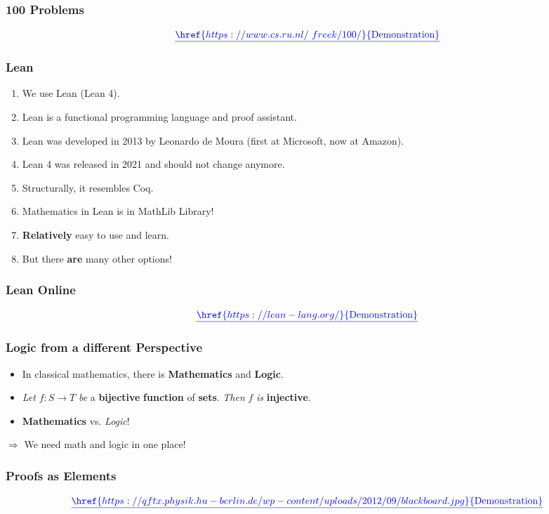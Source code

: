 \documentclass{beamer}
\theoremstyle{definition}
\theoremstyle{remark}
\begin{document}
\begin{frame}
	\frametitle{100 Problems}
	\[
		{\color{blue}\underline{\href{https://www.cs.ru.nl/~freek/100/}{\text{Demonstration}}}}
	\]
\end{frame}

\begin{frame}
	\frametitle{Lean}
		\begin{enumerate}
			\item We use Lean (Lean 4).
			\item Lean is a functional programming language and proof assistant.
			\item Lean was developed in 2013 by Leonardo de Moura (first at Microsoft, now at Amazon).
			\item Lean 4 was released in 2021 and should not change anymore.
			\item Structurally, it resembles Coq. 
			\item Mathematics in Lean is in MathLib Library! 
			\item \textbf{Relatively} easy to use and learn.
			\item But there \textbf{are} many other options!
		\end{enumerate}
\end{frame}

\begin{frame}
	\frametitle{Lean Online}
	
	\[
		{\color{blue}\underline{\href{https://lean-lang.org/}{\text{Demonstration}}}}
	\]
\end{frame}
\begin{frame}
	\frametitle{Logic from a different Perspective}
	\begin{itemize}
		\item In classical mathematics, there is \textbf{Mathematics} and \textbf{Logic}.
		\item \emph{Let} $f\colon S \to T$ \emph{be} a \textbf{bijective} \textbf{function} of \textbf{sets}. \emph{Then} $f$ \emph{is} \textbf{injective}. 
		\item \textbf{Mathematics} vs. \emph{Logic}! \vspace{1cm}
	\end{itemize}
 $\Rightarrow$ We need math and logic in one place!
\end{frame}

\begin{frame}
	\frametitle{Proofs as Elements}
	\[
		{\color{blue}\underline{\href{https://qftx.physik.hu-berlin.de/wp-content/uploads/2012/09/blackboard.jpg}{\text{Demonstration}}}}
	\]
\end{frame}
\end{document}
